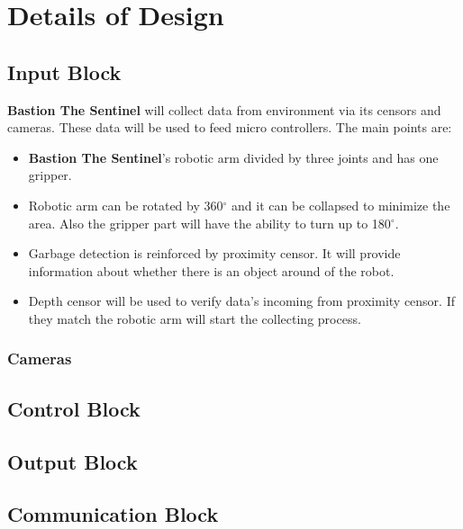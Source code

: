 \documentclass[12pt,a4paper]{article}
\begin{document}
 \section{Details of Design}
  \begin{flushleft}
   \subsection{Input Block}
    \begin{flushleft}
     \textbf{Bastion The Sentinel} will collect data from environment via its censors and cameras. These data will be used to 
     feed micro controllers. The main points are:
     \begin{itemize}
      \item \textbf{Bastion The Sentinel}'s robotic arm divided by three joints and has one gripper.
      \item Robotic arm can be rotated by 360$^{\circ}$ and it can be collapsed to minimize the area. Also the gripper part will 
      have the ability to turn up to 180$^{\circ}$.
      \item Garbage detection is reinforced by proximity censor. It will provide information about whether there is an object around 
      of the robot.
      \item Depth censor will be used to verify data's incoming from proximity censor. If they match the robotic arm will start the 
      collecting process.
     \end{itemize}

    \end{flushleft}

    \subsubsection{Cameras}
     \begin{flushleft}
      
     \end{flushleft}
   \subsection{Control Block}
   \subsection{Output Block}
   \subsection{Communication Block}
  
 \end{flushleft}
 
\end{document}
